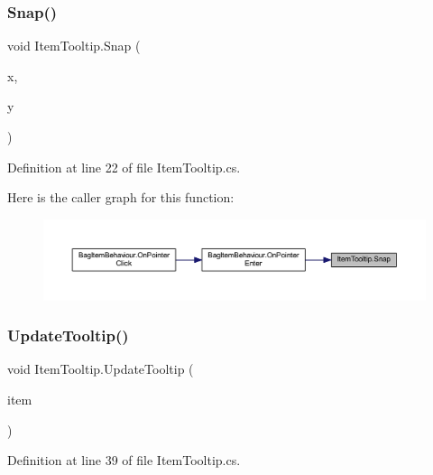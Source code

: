 \subsubsection{\texorpdfstring{Snap()}{Snap()}}
{\footnotesize\ttfamily void Item\+Tooltip.\+Snap (\begin{DoxyParamCaption}\item[{float}]{x,  }\item[{float}]{y }\end{DoxyParamCaption})}



Definition at line 22 of file Item\+Tooltip.\+cs.

Here is the caller graph for this function\+:
\nopagebreak
\begin{figure}[H]
\begin{center}
\leavevmode
\includegraphics[width=350pt]{class_item_tooltip_ae6eb8ab5acd326e431e46a3df5b76fa4_icgraph}
\end{center}
\end{figure}
\mbox{\label{class_item_tooltip_a51e15cd0c208c14105cc8bedf452385b}} 
\subsubsection{\texorpdfstring{UpdateTooltip()}{UpdateTooltip()}}
{\footnotesize\ttfamily void Item\+Tooltip.\+Update\+Tooltip (\begin{DoxyParamCaption}\item[{\mbox{\hyperlink{class_base_item}{Base\+Item}}}]{item }\end{DoxyParamCaption})}



Definition at line 39 of file Item\+Tooltip.\+cs.

